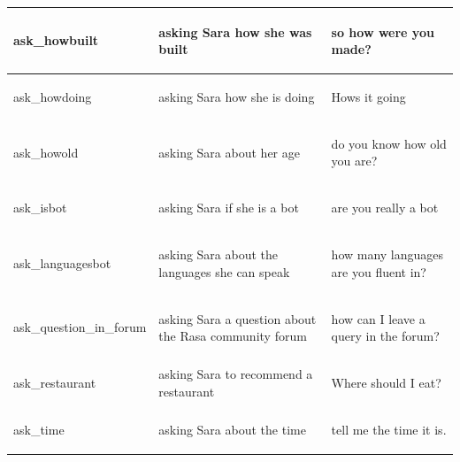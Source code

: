 \documentclass[bsc,frontabs,twoside,singlespacing,parskip,deptreport]{infthesis}
\begin{document}
{\begin{center}
\begin{longtable}{p{}|p{}|p{}}
    \hline
    \begin{spverbatim}ask_howbuilt\end{spverbatim} & asking Sara how she was built & \begin{spverbatim}so how were you made?\end{spverbatim} \\
    \hline
    \begin{spverbatim}ask_howdoing\end{spverbatim} & asking Sara how she is doing & \begin{spverbatim}Hows it going\end{spverbatim} \\
    \hline
    \begin{spverbatim}ask_howold\end{spverbatim} & asking Sara about her age & \begin{spverbatim}do you know how old you are?\end{spverbatim} \\
    \hline
    \begin{spverbatim}ask_isbot\end{spverbatim} & asking Sara if she is a bot & \begin{spverbatim}are you really a bot\end{spverbatim} \\
    \hline
    \begin{spverbatim}ask_languagesbot\end{spverbatim} & asking Sara about the languages she can speak & \begin{spverbatim}how many languages are you fluent in?\end{spverbatim} \\
    \hline
    \begin{spverbatim}ask_question_in_forum\end{spverbatim} & asking Sara a question about the Rasa community forum & \begin{spverbatim}how can I leave a query in the forum?\end{spverbatim} \\
    \hline
    \begin{spverbatim}ask_restaurant\end{spverbatim} & asking Sara to recommend a restaurant & \begin{spverbatim}Where should I eat?\end{spverbatim} \\
    \hline
    \begin{spverbatim}ask_time\end{spverbatim} & asking Sara about the time & \begin{spverbatim}tell me the time it is.\end{spverbatim} \\

\end{longtable}
\end{center}}
\end{document}
